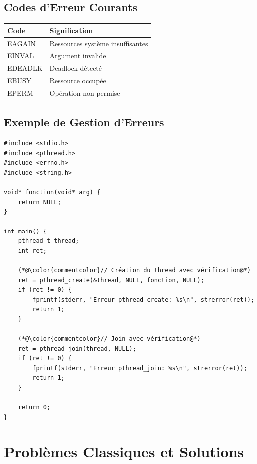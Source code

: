 \documentclass[11pt,a4paper]{article}
\begin{document}
\subsection{Codes d'Erreur Courants}

\begin{center}
\begin{tabular}{|l|p{8cm}|}
\hline
\textbf{Code} & \textbf{Signification} \\
\hline
EAGAIN & Ressources système insuffisantes \\
\hline
EINVAL & Argument invalide \\
\hline
EDEADLK & Deadlock détecté \\
\hline
EBUSY & Ressource occupée \\
\hline
EPERM & Opération non permise \\
\hline
\end{tabular}
\end{center}

\subsection{Exemple de Gestion d'Erreurs}

\begin{lstlisting}[caption={Vérification des erreurs}]
#include <stdio.h>
#include <pthread.h>
#include <errno.h>
#include <string.h>

void* fonction(void* arg) {
    return NULL;
}

int main() {
    pthread_t thread;
    int ret;
    
    (*@\color{commentcolor}// Création du thread avec vérification@*)
    ret = pthread_create(&thread, NULL, fonction, NULL);
    if (ret != 0) {
        fprintf(stderr, "Erreur pthread_create: %s\n", strerror(ret));
        return 1;
    }
    
    (*@\color{commentcolor}// Join avec vérification@*)
    ret = pthread_join(thread, NULL);
    if (ret != 0) {
        fprintf(stderr, "Erreur pthread_join: %s\n", strerror(ret));
        return 1;
    }
    
    return 0;
}
\end{lstlisting}

\section{Problèmes Classiques et Solutions}
\end{document}
